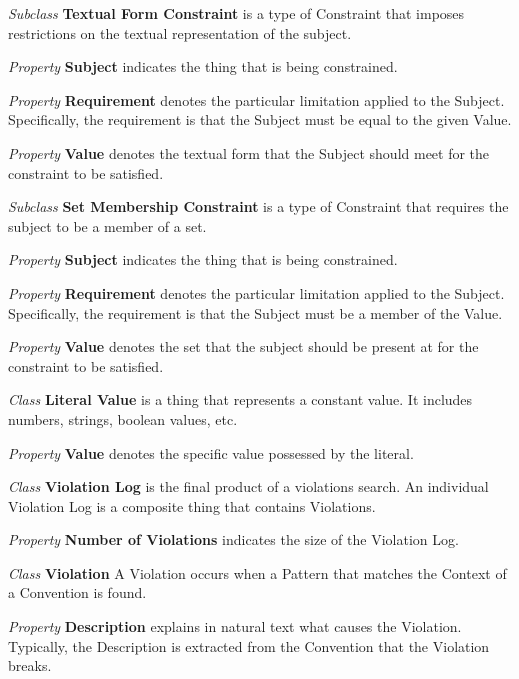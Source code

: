 \begin{description}
\item\textit{Subclass} \textbf{Textual Form Constraint} is a type of Constraint that imposes restrictions on the textual representation of the subject.

\textit{Property} \textbf{Subject} indicates the thing that is being constrained.

\textit{Property} \textbf{Requirement} denotes the particular limitation applied to the Subject. Specifically, the requirement is that the Subject must be equal to the given Value.

\textit{Property} \textbf{Value} denotes the textual form that the Subject should meet for the constraint to be satisfied.


\item\textit{Subclass} \textbf{Set Membership Constraint} is a type of Constraint that requires the subject to be a member of a set.

\textit{Property} \textbf{Subject} indicates the thing that is being constrained.

\textit{Property} \textbf{Requirement} denotes the particular limitation applied to the Subject. Specifically, the requirement is that the Subject must be a member of the Value.

\textit{Property} \textbf{Value} denotes the set that the subject should be present at for the constraint to be satisfied.


\item\textit{Class} \textbf{Literal Value} is a thing that represents a constant value. It includes numbers, strings, boolean values, etc.

\textit{Property} \textbf{Value} denotes the specific value possessed by the literal.


\item\textit{Class} \textbf{Violation Log} is the final product of a violations search. An individual Violation Log is a composite thing that contains Violations.

\textit{Property} \textbf{Number of Violations} indicates the size of the Violation Log. 


\item\textit{Class} \textbf{Violation} A Violation occurs when a Pattern that matches the Context of a Convention is found.

\textit{Property} \textbf{Description} explains in natural text what causes the Violation. Typically, the Description is extracted from the Convention that the Violation breaks.


\end{description}

